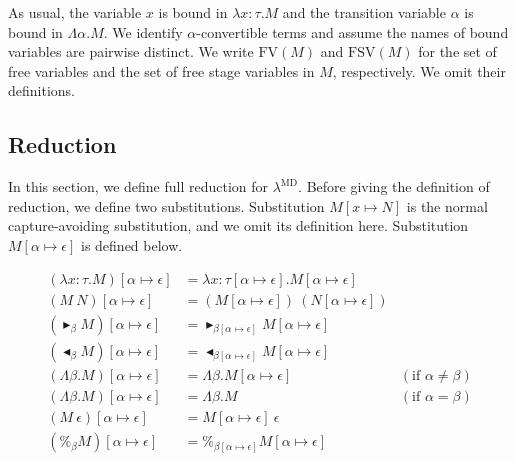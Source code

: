 \documentclass[runningheads]{llncs}
\newcommand{\LMD}{$\lambda^{\textrm{MD}}$\xspace}
\newcommand{\TB}{\blacktriangleright}
\newcommand{\TBL}{\blacktriangleleft}
\newcommand{\FV}{\text{FV}}
\newcommand{\FTV}{\text{FSV}}
\begin{document}
As usual, the variable $x$ is bound in $\lambda x:\tau.M$
and the transition variable $\alpha$ is bound in $\Lambda \alpha.M$.
We identify $\alpha$-convertible terms and assume the names of bound variables are pairwise distinct.
We write $\FV(M)$ and $\FTV(M)$ for the set of free variables and the set of free stage variables in $M$, respectively.
We omit their definitions.

\subsection{Reduction}

In this section, we define full reduction for \LMD.
Before giving the definition of reduction, we define two substitutions.
Substitution $M[x\mapsto N]$ is the normal capture-avoiding substitution, and we omit its definition here.
Substitution $M[\alpha \mapsto \epsilon]$ is defined below.

\begin{align*}
	(\lambda x:\tau.M)[\alpha \mapsto \epsilon] & = \lambda x:\tau[\alpha \mapsto \epsilon].M[\alpha \mapsto \epsilon]                                  \\
	(M\ N)[\alpha \mapsto \epsilon]             & = (M[\alpha \mapsto \epsilon])\ (N[\alpha \mapsto \epsilon])                                          \\
	(\TB_\beta M)[\alpha \mapsto \epsilon]      & = \TB_{\beta[\alpha \mapsto \epsilon]} M[\alpha \mapsto \epsilon]                                     \\
	(\TBL_\beta M)[\alpha \mapsto \epsilon]     & = \TBL_{\beta[\alpha \mapsto \epsilon]} M[\alpha \mapsto \epsilon]                                    \\
	(\Lambda\beta.M)[\alpha \mapsto \epsilon]   & = \Lambda\beta.M[\alpha \mapsto \epsilon]                            & (\text{if } \alpha \neq \beta) \\
	(\Lambda\beta.M)[\alpha \mapsto \epsilon]   & = \Lambda\beta.M                                                     & (\text{if } \alpha = \beta)    \\
	(M\ \epsilon)[\alpha \mapsto \epsilon]      & = M[\alpha \mapsto \epsilon]\ \epsilon                                                                \\
	(\%_\beta M)[\alpha \mapsto \epsilon]       & = \%_{\beta[\alpha \mapsto \epsilon]}M[\alpha \mapsto \epsilon] 
\end{align*}
\end{document}
